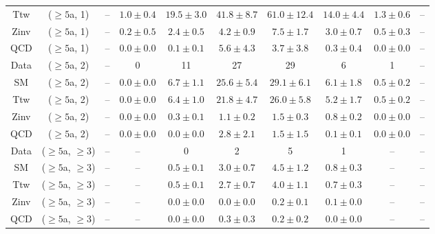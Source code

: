 \begin{table}[h!]
{\begin{tabular}{cccccccccc}
	Ttw & ($\ge5$a, 1) & -- & $1.0\pm 0.4$ & $19.5\pm 3.0$ & $41.8\pm 8.7$ & $61.0\pm 12.4$ & $14.0\pm 4.4$ & $1.3\pm 0.6$ & -- \\[0.5ex] 
	Zinv & ($\ge5$a, 1) & -- & $0.2\pm 0.5$ & $2.4\pm 0.5$ & $4.2\pm 0.9$ & $7.5\pm 1.7$ & $3.0\pm 0.7$ & $0.5\pm 0.3$ & -- \\[0.5ex] 
	QCD & ($\ge5$a, 1) & -- & $0.0\pm 0.0$ & $0.1\pm 0.1$ & $5.6\pm 4.3$ & $3.7\pm 3.8$ & $0.3\pm 0.4$ & $0.0\pm 0.0$ & -- \\[0.5ex] 
	Data & ($\ge5$a, 2) & -- & 0 & 11 & 27 & 29 & 6 & 1 & -- \\[0.5ex] 
	SM & ($\ge5$a, 2) & -- & $0.0\pm 0.0$ & $6.7\pm 1.1$ & $25.6\pm 5.4$ & $29.1\pm 6.1$ & $6.1\pm 1.8$ & $0.5\pm 0.2$ & -- \\[0.5ex] 
	Ttw & ($\ge5$a, 2) & -- & $0.0\pm 0.0$ & $6.4\pm 1.0$ & $21.8\pm 4.7$ & $26.0\pm 5.8$ & $5.2\pm 1.7$ & $0.5\pm 0.2$ & -- \\[0.5ex] 
	Zinv & ($\ge5$a, 2) & -- & $0.0\pm 0.0$ & $0.3\pm 0.1$ & $1.1\pm 0.2$ & $1.5\pm 0.3$ & $0.8\pm 0.2$ & $0.0\pm 0.0$ & -- \\[0.5ex] 
	QCD & ($\ge5$a, 2) & -- & $0.0\pm 0.0$ & $0.0\pm 0.0$ & $2.8\pm 2.1$ & $1.5\pm 1.5$ & $0.1\pm 0.1$ & $0.0\pm 0.0$ & -- \\[0.5ex] 
	Data & ($\ge5$a, $\ge3$) & -- & -- & 0 & 2 & 5 & 1 & -- & -- \\[0.5ex] 
	SM & ($\ge5$a, $\ge3$) & -- & -- & $0.5\pm 0.1$ & $3.0\pm 0.7$ & $4.5\pm 1.2$ & $0.8\pm 0.3$ & -- & -- \\[0.5ex] 
	Ttw & ($\ge5$a, $\ge3$) & -- & -- & $0.5\pm 0.1$ & $2.7\pm 0.7$ & $4.0\pm 1.1$ & $0.7\pm 0.3$ & -- & -- \\[0.5ex] 
	Zinv & ($\ge5$a, $\ge3$) & -- & -- & $0.0\pm 0.0$ & $0.0\pm 0.0$ & $0.2\pm 0.1$ & $0.1\pm 0.0$ & -- & -- \\[0.5ex] 
	QCD & ($\ge5$a, $\ge3$) & -- & -- & $0.0\pm 0.0$ & $0.3\pm 0.3$ & $0.2\pm 0.2$ & $0.0\pm 0.0$ & -- & -- \\[0.5ex] 
	\hline
	\hline
\end{tabular}}
\end{table}
